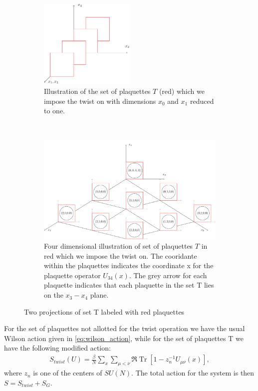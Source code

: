 \documentclass[english,twoside,openright]{UH_TCM_MSc}
\DeclareMathOperator{\Tr}{Tr}
\begin{document}
\begin{figure}[htpb]
    \centering
    \begin{subfigure}[t]{\textwidth}
        \centering
        \includegraphics[width=0.5\textwidth]{final_plots/misc/set_T_collapsed.pdf}
        \caption{Illustration of the set of plaquettes $T$ (red) which we impose the twist on with dimensions $x_0$ and $x_1$ reduced to one.}
    \end{subfigure}\\
    \begin{subfigure}[t]{\textwidth}
        \centering
        \includegraphics[width=1\textwidth]{final_plots/misc/set_T.pdf}
        \caption{Four dimensional illustration of set of plaquettes $T$ in red which we impose the twist on. The cooridante within the plaquettes indicates the coordinate x for the plaquette operator $U_{34}(x)$. The grey arrow for each plaquette indicates that each plaquette in the set T lies on the $x_3 - x_4$ plane.}
    \end{subfigure}
    \caption{Two projections of set T labeled with red plaquettes}
    \label{fig:twist_plaquettes}
\end{figure}
For the set of plaquettes not allotted for the twist operation we have the usual Wilson action given in \ref{eq:wilson_action}, while for the set of plaquettes T we have the following modified action:
\begin{align}
    S_{twist}(U) = \frac{\beta}{N}\sum_{x}\sum_{\mu < \nu} \Re \Tr[1-z^{-1}_{n}U_{\mu\nu}(x)],
\end{align}
where $z_n$ is one of the centers of $SU(N)$. The total action for the system is then $S=S_{twist} + S_G$. 
\end{document}
